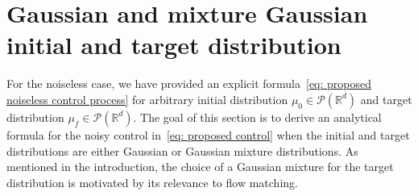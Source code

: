 \documentclass[12pt]{amsart}
\newcommand{\R}{\mathbb{R}}
\renewcommand{\(}{\left (}
\renewcommand{\)}{\right )}
\numberwithin{equation}{section}
\begin{document}
\vspace{-9.0mm}



\section{Gaussian and mixture Gaussian initial and target distribution}\label{sec: Gaussian and mixture Gaussian initial and target distribution}
For the noiseless case, we have provided an explicit formula~\eqref{eq: proposed noiseless control process} for arbitrary initial distribution $\mu_0\in\mathcal{P}(\R^d)$ and target distribution $\mu_f\in\mathcal{P}(\R^d)$. The goal of this section is to derive an analytical formula for the noisy control in~\eqref{eq: proposed control} when the initial and target distributions are either Gaussian or Gaussian mixture distributions. As mentioned in the introduction, the choice of a Gaussian mixture for the target distribution is motivated by its relevance to flow matching.
\end{document}
